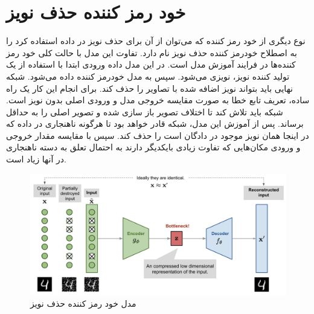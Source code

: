 \documentclass[12pt,a4paper]{report}
\theoremstyle{definition}
\theoremstyle{definition}
\begin{document}
\section{خود رمز کننده حذف نویز}
نوع دیگری از خود رمز کننده که می‌توان از آن برای حذف نویز در داده استفاده کرد را به اصطلاح خودرمز کننده حذف نویز نام دارد. تفاوت این مدل با حالت کلی خود رمز کننده‌ها در فرایند آموزش مدل است. در این مدل داده ورودی ابتدا با استفاده از یک تولید کننده نویز، نویزی می‌شود. سپس به مدل خودرمز کننده داده می‌شود. شبکه نهایی باید بتواند نویز اضافه شده با تصاویر را حذف کند. برای انجام این کار یک راه ساده، تعریف تابع خطا به صورت مقایسه خروجی مدل و ورودی اصلی بدون نویز است. شبکه باید تلاش کند تا اختلاف تصویر باز سازی شده و تصویر اصلی را به حداقل برساند. پس از آموزش این مدل، شبکه قادر خواهد بود تا هرگونه ناهنجاری در داده که در اینجا همان نویز موجود در دادگان است را حذف کند. سپس با مقایسه مقدار خروجی و ورودی مکان‌هایی که تفاوت زیادی بایکدیگر دارند به احتمال تعلق به دسته ناهنجاری در آنها زیاد است.

\begin{figure}[!h]
	\begin{center}
		\includegraphics[width=\linewidth]{./images/figures/dae.png}
	\end{center}
	\caption{مدل خود رمز کننده حذف نویز}
	\label{fig:dae}
	\centering
\end{figure}
\end{document}
